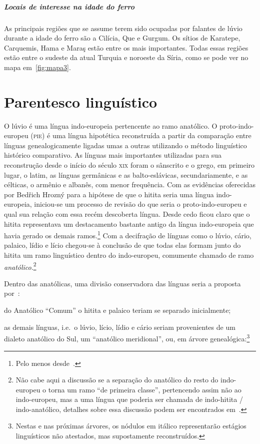 \paragraph{Locais de interesse na idade do ferro}
As principais regiões que se assume terem sido ocupadas por falantes de lúvio
durante a idade do ferro são a Cilícia, Que e Gurgum.
Os sítios de Karatepe, Carquemis, Hama e Maraş estão entre os mais importantes.
Todas essas regiões estão entre o sudeste da atual Turquia e noroeste da Síria,
como se pode ver no mapa em~\autoref{fig:mapa3}.

\chapter{Parentesco linguístico}

O lúvio é uma língua indo-europeia pertencente ao ramo anatólico.
O proto-indo-europeu (\textsc{pie}) é uma língua hipotética reconstruída a
partir da comparação entre línguas genealogicamente ligadas umas a outras
utilizando o método linguístico histórico comparativo.
As línguas mais importantes utilizadas para sua reconstrução desde o início do
século \textsc{xix} foram o sânscrito e o grego, em primeiro lugar, o latim, as
línguas germânicas e as balto-eslávicas, secundariamente, e as célticas,
o armênio e albanês, com menor frequência.
Com as evidências oferecidas por Bedřich Hrozný para a hipótese de que o
hitita seria uma língua indo-europeia, iniciou-se um processo de revisão do que
seria o proto-indo-europeu e qual sua relação com essa recém descoberta língua.
Desde cedo ficou claro que o hitita representava um destacamento bastante antigo
da língua indo-europeia que havia gerado os demais ramos.\footnote{Pelo menos
	desde~\citet{Sturtevant1933}.}
Com a decifração de línguas como o lúvio, cário, palaico, lídio e lício chegou-se
à conclusão de que todas elas formam junto do hitita um ramo linguístico dentro do
indo-europeu, comumente chamado de ramo \emph{anatólico}.\footnote{Não cabe aqui
	a discussão se a separação do anatólico do resto do indo-europeu o torna um
	ramo ``de primeira classe'', pertencendo assim não ao indo-europeu, mas a uma
	língua que poderia ser chamada de indo-hitita \slash{} indo-anatólico,
	detalhes sobre essa discussão podem ser encontrados em~\citet{Ringue2017}.}

Dentro das anatólicas, uma divisão conservadora das línguas seria a proposta
por~\citet[305--6]{Rieken2017}:
\begin{inparaenum}
	\item do Anatólico ``Comum'' o hitita e palaico teriam se separado
	inicialmente;
	\item as demais línguas, i.e.\ o lúvio, lício, lídio e cário seriam
	provenientes de um dialeto anatólico do Sul, um
	``anatólico meridional'', ou, em árvore genealógica:\footnote{Nestas e nas
		próximas árvores, os nódulos em itálico representarão estágios linguísticos
		não atestados, mas supostamente reconstruídos.}
\end{inparaenum}

